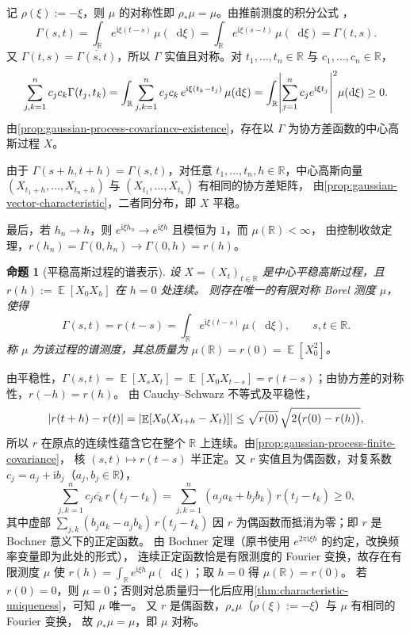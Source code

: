 \documentclass[UTF8,11pt,a4paper,oneside,fontset=fandol]{ctexrep}
\makeatletter
\numberwithin{equation}{section}
\theoremstyle{zhthm}
\newtheorem{proposition}[theorem]{命题}
\renewenvironment{proof}[1][\proofname]{\par
  \pushQED{\qed}%
  \normalfont\topsep6\p@\@plus6\p@\relax
  \trivlist
  \item[\hskip\labelsep\bfseries#1\hspace{0.5em}]\ignorespaces
}{%
  \popQED\endtrivlist\@endpefalse
}
\renewcommand{\proofname}{证明}
\newcommand{\R}{\mathbb{R}}
\DeclareMathOperator{\E}{\mathbb{E}}
\newcommand{\iu}{\mathrm{i}}
\newcommand{\dd}{\mathop{}\!\mathrm{d}}
\DeclarePairedDelimiter{\abs}{\lvert}{\rvert}
\makeatother
\begin{document}
\begin{proof}
记 $\rho(\xi):=-\xi$，则 $\mu$ 的对称性即 $\rho_*\mu=\mu$。由推前测度的积分公式%
\cite[练习 1.4.38(ii)，第 103 页]{Tao2011}，
\[
  \Gamma(s,t)=\int_{\R}e^{\iu\xi(t-s)}\,\mu(\dd\xi)
  =\int_{\R}e^{\iu\xi(s-t)}\,\mu(\dd\xi)=\Gamma(t,s).
\]
又 $\Gamma(t,s)=\overline{\Gamma(s,t)}$，所以 $\Gamma$ 实值且对称。对 $t_1,\ldots,t_n\in\R$ 与 $c_1,\ldots,c_n\in\R$，
\[
  \sum_{j,k=1}^{n}c_jc_k\Gamma(t_j,t_k)
  =\int_{\R}\sum_{j,k=1}^{n}c_jc_k\,e^{\iu\xi(t_k-t_j)}\,\mu(\dd\xi)
  =\int_{\R}\abs*{\sum_{j=1}^{n}c_je^{\iu\xi t_j}}^2\mu(\dd\xi)\ge0.
\]
由\cref{prop:gaussian-process-covariance-existence}，存在以 $\Gamma$ 为协方差函数的中心高斯过程 $X$。

由于 $\Gamma(s+h,t+h)=\Gamma(s,t)$，对任意 $t_1,\ldots,t_n,h\in\R$，中心高斯向量
$(X_{t_1+h},\ldots,X_{t_n+h})$ 与 $(X_{t_1},\ldots,X_{t_n})$ 有相同的协方差矩阵，
由\cref{prop:gaussian-vector-characteristic}，二者同分布，即 $X$ 平稳。

最后，若 $h_n\to h$，则 $e^{\iu\xi h_n}\to e^{\iu\xi h}$ 且模恒为 $1$，而 $\mu(\R)<\infty$，
由控制收敛定理，$r(h_n)=\Gamma(0,h_n)\to\Gamma(0,h)=r(h)$。
\end{proof}

\begin{proposition}[平稳高斯过程的谱表示]
\label{prop:stationary-gaussian-bochner}
设 $X=(X_t)_{t\in\R}$ 是中心平稳高斯过程，且 $r(h):=\E[X_0X_h]$ 在 $h=0$ 处连续。
则存在唯一的有限对称 Borel 测度 $\mu$，使得
\[
  \Gamma(s,t)=r(t-s)=\int_{\R}e^{\iu\xi(t-s)}\,\mu(\dd\xi),\qquad s,t\in\R.
\]
称 $\mu$ 为该过程的谱测度，其总质量为 $\mu(\R)=r(0)=\E[X_0^2]$。
\end{proposition}

\begin{proof}
由平稳性，$\Gamma(s,t)=\E[X_sX_t]=\E[X_0X_{t-s}]=r(t-s)$；由协方差的对称性，$r(-h)=r(h)$。
由 Cauchy--Schwarz 不等式及平稳性，
\[
  \abs{r(t+h)-r(t)}=\abs{\E[X_0(X_{t+h}-X_t)]}
  \le\sqrt{r(0)}\,\sqrt{2\bigl(r(0)-r(h)\bigr)},
\]
所以 $r$ 在原点的连续性蕴含它在整个 $\R$ 上连续。由\cref{prop:gaussian-process-finite-covariance}，
核 $(s,t)\mapsto r(t-s)$ 半正定。又 $r$ 实值且为偶函数，对复系数 $c_j=a_j+\iu b_j$（$a_j,b_j\in\R$），
\[
  \sum_{j,k=1}^{n}c_j\overline{c_k}\,r(t_j-t_k)=\sum_{j,k=1}^{n}(a_ja_k+b_jb_k)\,r(t_j-t_k)\ge0,
\]
其中虚部 $\sum_{j,k}(b_ja_k-a_jb_k)\,r(t_j-t_k)$ 因 $r$ 为偶函数而抵消为零；即 $r$ 是 Bochner 意义下的正定函数。
由 Bochner 定理\cite[定理 1.12.14，第 205 页]{Tao2010}（原书使用 $e^{2\pi\iu\xi h}$ 的约定，改换频率变量即为此处的形式），
连续正定函数恰是有限测度的 Fourier 变换，故存在有限测度 $\mu$ 使
$r(h)=\int_{\R}e^{\iu\xi h}\,\mu(\dd\xi)$；取 $h=0$ 得 $\mu(\R)=r(0)$。
若 $r(0)=0$，则 $\mu=0$；否则对总质量归一化后应用\cref{thm:characteristic-uniqueness}，可知 $\mu$ 唯一。
又 $r$ 是偶函数，$\rho_*\mu$（$\rho(\xi):=-\xi$）与 $\mu$ 有相同的 Fourier 变换，
故 $\rho_*\mu=\mu$，即 $\mu$ 对称。
\end{proof}
\end{document}
